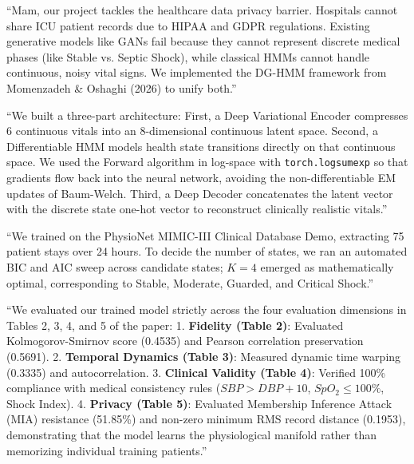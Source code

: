\documentclass[11pt,a4paper]{article}
\begin{document}
\begin{tcolorbox}[title=\textbf{Step 1: The Context \& The Problem}]
``Mam, our project tackles the healthcare data privacy barrier. Hospitals cannot share ICU patient records due to HIPAA and GDPR regulations. Existing generative models like GANs fail because they cannot represent discrete medical phases (like Stable vs. Septic Shock), while classical HMMs cannot handle continuous, noisy vital signs. We implemented the DG-HMM framework from Momenzadeh \& Oshaghi (2026) to unify both.''
\end{tcolorbox}

\begin{tcolorbox}[title=\textbf{Step 2: How the Model Works Under the Hood}]
``We built a three-part architecture:
First, a Deep Variational Encoder compresses 6 continuous vitals into an 8-dimensional continuous latent space.
Second, a Differentiable HMM models health state transitions directly on that continuous space. We used the Forward algorithm in log-space with \texttt{torch.logsumexp} so that gradients flow back into the neural network, avoiding the non-differentiable EM updates of Baum-Welch.
Third, a Deep Decoder concatenates the latent vector with the discrete state one-hot vector to reconstruct clinically realistic vitals.''
\end{tcolorbox}

\begin{tcolorbox}[title=\textbf{Step 3: State Selection \& Preprocessing}]
``We trained on the PhysioNet MIMIC-III Clinical Database Demo, extracting 75 patient stays over 24 hours. To decide the number of states, we ran an automated BIC and AIC sweep across candidate states; $K = 4$ emerged as mathematically optimal, corresponding to Stable, Moderate, Guarded, and Critical Shock.''
\end{tcolorbox}

\begin{tcolorbox}[title=\textbf{Step 4: Comprehensive 4-Dimension Evaluation}]
``We evaluated our trained model strictly across the four evaluation dimensions in Tables 2, 3, 4, and 5 of the paper:
1. \textbf{Fidelity (Table 2)}: Evaluated Kolmogorov-Smirnov score (0.4535) and Pearson correlation preservation (0.5691).
2. \textbf{Temporal Dynamics (Table 3)}: Measured dynamic time warping (0.3335) and autocorrelation.
3. \textbf{Clinical Validity (Table 4)}: Verified 100\% compliance with medical consistency rules ($SBP > DBP + 10$, $SpO_2 \le 100\%$, Shock Index).
4. \textbf{Privacy (Table 5)}: Evaluated Membership Inference Attack (MIA) resistance (51.85\%) and non-zero minimum RMS record distance (0.1953), demonstrating that the model learns the physiological manifold rather than memorizing individual training patients.''
\end{tcolorbox}
\end{document}

